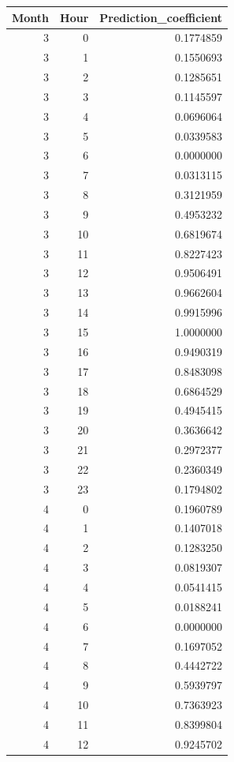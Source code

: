 \documentclass[
]{book}
\begin{document}
\begin{tabular}{r|r|r}
\hline
Month & Hour & Prediction\_coefficient\\
\hline
3 & 0 & 0.1774859\\
\hline
3 & 1 & 0.1550693\\
\hline
3 & 2 & 0.1285651\\
\hline
3 & 3 & 0.1145597\\
\hline
3 & 4 & 0.0696064\\
\hline
3 & 5 & 0.0339583\\
\hline
3 & 6 & 0.0000000\\
\hline
3 & 7 & 0.0313115\\
\hline
3 & 8 & 0.3121959\\
\hline
3 & 9 & 0.4953232\\
\hline
3 & 10 & 0.6819674\\
\hline
3 & 11 & 0.8227423\\
\hline
3 & 12 & 0.9506491\\
\hline
3 & 13 & 0.9662604\\
\hline
3 & 14 & 0.9915996\\
\hline
3 & 15 & 1.0000000\\
\hline
3 & 16 & 0.9490319\\
\hline
3 & 17 & 0.8483098\\
\hline
3 & 18 & 0.6864529\\
\hline
3 & 19 & 0.4945415\\
\hline
3 & 20 & 0.3636642\\
\hline
3 & 21 & 0.2972377\\
\hline
3 & 22 & 0.2360349\\
\hline
3 & 23 & 0.1794802\\
\hline
4 & 0 & 0.1960789\\
\hline
4 & 1 & 0.1407018\\
\hline
4 & 2 & 0.1283250\\
\hline
4 & 3 & 0.0819307\\
\hline
4 & 4 & 0.0541415\\
\hline
4 & 5 & 0.0188241\\
\hline
4 & 6 & 0.0000000\\
\hline
4 & 7 & 0.1697052\\
\hline
4 & 8 & 0.4442722\\
\hline
4 & 9 & 0.5939797\\
\hline
4 & 10 & 0.7363923\\
\hline
4 & 11 & 0.8399804\\
\hline
4 & 12 & 0.9245702\\

\end{tabular}
\end{document}
